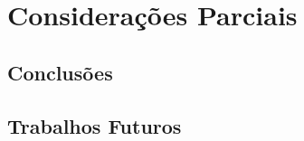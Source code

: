 \chapter{Considerações Parciais} \label{cap:conclusao}

\section{Conclusões}

\section{Trabalhos Futuros}



